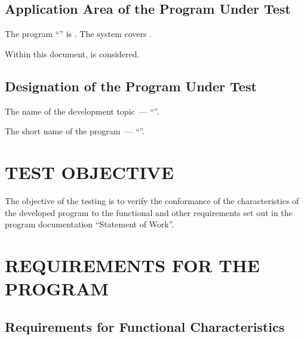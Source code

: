 \documentclass[12pt,a4paper]{extarticle}
\begin{document}
\subsection{Application Area of the Program Under Test}


The program \enquote{\projectname} is . The system covers .

Within this document,  is considered.

\subsection{Designation of the Program Under Test}

The name of the development topic~--- \enquote{\projectname}.

The short name of the program~--- \enquote{\hseProjectNameShort}.

\clearpage

\section{TEST OBJECTIVE}

The objective of the testing is to verify the conformance of the characteristics of the developed program to the functional and other requirements set out in the program documentation \enquote{Statement of Work}.

\clearpage

\section{REQUIREMENTS FOR THE PROGRAM}

\subsection{Requirements for Functional Characteristics}
\end{document}
